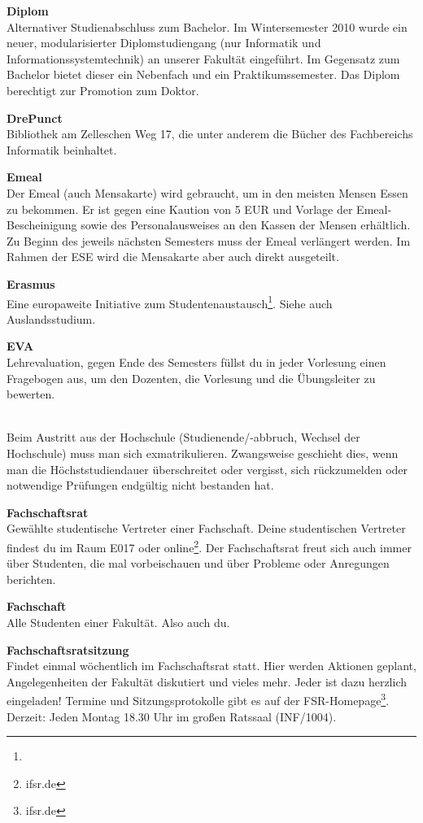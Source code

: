 \textbf{Diplom} \\
Alternativer Studienabschluss zum Bachelor.
Im Wintersemester 2010 wurde ein neuer, modularisierter Diplomstudiengang (nur Informatik und Informationssystemtechnik) an unserer Fakultät eingeführt.
Im Gegensatz zum Bachelor bietet dieser ein Nebenfach und ein Praktikumssemester.
Das Diplom berechtigt zur Promotion zum Doktor.

\textbf{DrePunct} \\
Bibliothek am Zelleschen Weg 17, die unter anderem die Bücher des Fachbereichs Informatik beinhaltet.

\textbf{Emeal} \\
Der Emeal (auch Mensakarte) wird gebraucht, um in den meisten Mensen Essen zu bekommen.
Er ist gegen eine Kaution von 5 EUR und Vorlage der Emeal-Bescheinigung sowie des Personalausweises an den Kassen der Mensen erhältlich.
Zu Beginn des jeweils nächsten Semesters muss der Emeal verlängert werden.
Im Rahmen der ESE wird die Mensakarte aber auch direkt ausgeteilt.

\textbf{Erasmus} \\
Eine europaweite Initiative zum Studentenaustausch\footnote{}.
Siehe auch Auslandsstudium.

\textbf{EVA} \\
Lehrevaluation, gegen Ende des Semesters füllst du in jeder Vorlesung einen Fragebogen aus, um den Dozenten, die Vorlesung und die Übungsleiter zu bewerten.

 \\
Beim Austritt aus der Hochschule (Studienende/-abbruch, Wechsel der Hochschule) muss man sich exmatrikulieren.
Zwangsweise geschieht dies, wenn man die Höchststudiendauer überschreitet oder vergisst, sich rückzumelden oder notwendige Prüfungen endgültig nicht bestanden hat.

\textbf{Fachschaftsrat} \\
Gewählte studentische Vertreter einer Fachschaft.
Deine studentischen Vertreter findest du im Raum E017 oder online\footnote{ifsr.de}.
Der Fachschaftsrat freut sich auch immer über Studenten, die mal vorbeischauen und über Probleme oder Anregungen berichten.

\textbf{Fachschaft} \\
Alle Studenten einer Fakultät. Also auch du.

\textbf{Fachschaftsratsitzung} \\
Findet einmal wöchentlich im Fachschaftsrat statt.
Hier werden Aktionen geplant, Angelegenheiten der Fakultät diskutiert und vieles mehr.
Jeder ist dazu herzlich eingeladen!
Termine und Sitzungsprotokolle gibt es auf der FSR-Homepage\footnote{ifsr.de}.
Derzeit:
Jeden Montag 18.30 Uhr im großen Ratssaal (INF/1004).

